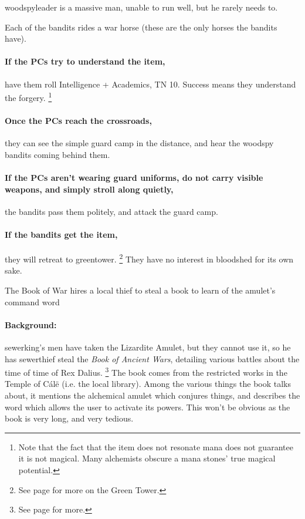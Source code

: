 \begin{multicols}{2}


\woodspyleader

\Gls{woodspyleader} is a massive man, unable to run well, but he rarely needs to.

Each of the bandits rides a war horse (these are the only horses the bandits have).

\paragraph{If the PCs try to understand the item,}
have them roll Intelligence + Academics, TN 10.
Success means they understand the forgery.%
  \footnote{Note that the fact that the item does not resonate mana does not guarantee it is not magical.
  Many alchemists obscure a mana stones' true magical potential.
  \iftoggle{core}{See page \pageref{manaTrick} in the core rules.}{}
}

\paragraph{Once the PCs reach the crossroads,}
they can see the simple \gls{guard} camp in the distance, and hear the woodspy bandits coming behind them.

\paragraph{If the PCs aren't wearing \gls{guard} uniforms, do not carry visible weapons, and simply stroll along quietly,}
the bandits pass them politely, and attack the \gls{guard} camp.

\paragraph{If the bandits get the item,} they will retreat to \gls{greentower}.%
\footnote{See page \pageref{green_tower} for more on the Green Tower.}
They have no interest in bloodshed for its own sake.

{The Book of War}%
{ hires a local thief to steal a book to learn of the amulet's command word}%

\paragraph{Background:}
\Gls{sewerking}'s men have taken the Lizardite Amulet, but they cannot use it, so he has \gls{sewerthief} steal the \textit{Book of Ancient Wars}, detailing various battles about the time of time of Rex Dalius.%
\footnote{See page \pageref{h_dalius} for more.}
The book comes from the restricted works in the Temple of C\'{a}l\"{e} (i.e. the local library).
Among the various things the book talks about, it mentions the alchemical amulet which conjures things, and describes the word which allows the user to activate its powers.
This won't be obvious as the book is very long, and very tedious.


\end{multicols}

